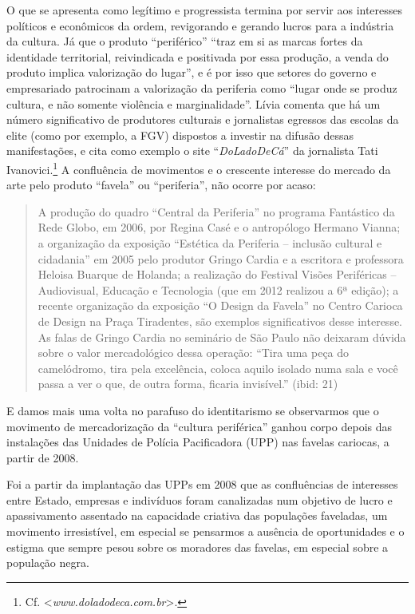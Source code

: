 O que se apresenta como legítimo e progressista termina por servir aos
interesses políticos e econômicos da ordem, revigorando e gerando lucros
para a indústria da cultura. Já que o produto ``periférico'' ``traz em
si as marcas fortes da identidade territorial, reivindicada e positivada
por essa produção, a venda do produto implica valorização do lugar'', e
é por isso que setores do governo e empresariado patrocinam a
valorização da periferia como ``lugar onde se produz cultura, e não
somente violência e marginalidade''. Lívia comenta que há um número
significativo de produtores culturais e jornalistas egressos das escolas
da elite (como por exemplo, a FGV) dispostos a investir na difusão
dessas manifestações, e cita como exemplo o site ``\emph{DoLadoDeCá}''
da jornalista Tati Ivanovici.\footnote{Cf.
  \textless{}\emph{www.doladodeca.com.br}\textgreater{}.} A
confluência de movimentos e o crescente interesse do mercado da arte
pelo produto ``favela'' ou ``periferia'', não ocorre por acaso:

\begin{quote}
A produção do quadro ``Central da Periferia'' no programa Fantástico da
Rede Globo, em 2006, por Regina Casé e o antropólogo Hermano Vianna; a
organização da exposição ``Estética da Periferia -- inclusão cultural e
cidadania'' em 2005 pelo produtor Gringo Cardia e a escritora e
professora Heloisa Buarque de Holanda; a realização do Festival Visões
Periféricas -- Audiovisual, Educação e Tecnologia (que em 2012 realizou
a 6ª edição); a recente organização da exposição ``O Design da Favela''
no Centro Carioca de Design na Praça Tiradentes, são exemplos
significativos desse interesse. As falas de Gringo Cardia no seminário
de São Paulo não deixaram dúvida sobre o valor mercadológico dessa
operação: ``Tira uma peça do camelódromo, tira pela excelência, coloca
aquilo isolado numa sala e você passa a ver o que, de outra forma,
ficaria invisível.'' (ibid: 21)
\end{quote}

E damos mais uma volta no parafuso do identitarismo se observarmos que o
movimento de mercadorização da ``cultura periférica'' ganhou corpo
depois das instalações das Unidades de Polícia Pacificadora (UPP) nas
favelas cariocas, a partir de 2008.

Foi a partir da implantação das UPPs em 2008 que as confluências de
interesses entre Estado, empresas e indivíduos foram canalizadas num
objetivo de lucro e apassivamento assentado na capacidade criativa das
populações faveladas, um movimento irresistível, em especial se
pensarmos a ausência de oportunidades e o estigma que sempre pesou sobre
os moradores das favelas, em especial sobre a população negra.

